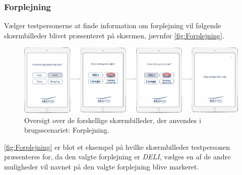 \subsubsection*{Forplejning}
%
Vælger testpersonerne at finde information om forplejning vil følgende skærmbilleder blivet præsenteret på skærmen, jævnfør \autoref{fig:Forplejning}. 
%
\begin{figure}[H]
\centering
\includegraphics[width = \textwidth]{Figure/TestdesignParametre/Forplejning} 
\caption{Oversigt over de forskellige skærmbilleder, der anvendes i brugsscenariet: Forplejning.}
\label{fig:Forplejning}
\end{figure}
\noindent
% 
\autoref{fig:Forplejning} er blot et eksempel på hvilke skærmbilleder testpersonen præsenteres for, da den valgte forplejning er \textit{DELI}, vælges en af de andre muligheder vil navnet på den valgte forplejning blive markeret. 

